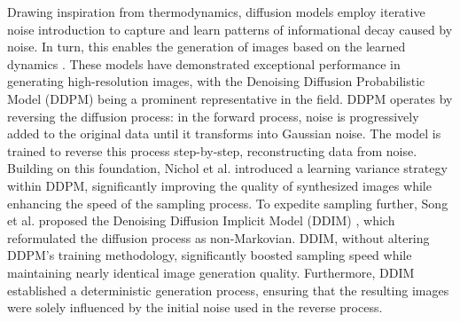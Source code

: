 Drawing inspiration from thermodynamics, diffusion models employ iterative noise introduction to capture and learn patterns of informational decay caused by noise. In turn, this enables the generation of images based on the learned dynamics \cite{Sohl-Dickstein2015DeepUnsupervisedLearning}. These models have demonstrated exceptional performance in generating high-resolution images, with the Denoising Diffusion Probabilistic Model (DDPM) \cite{Ho2020DenoisingDiffusionProbabilistic} being a prominent representative in the field. DDPM operates by reversing the diffusion process: in the forward process, noise is progressively added to the original data until it transforms into Gaussian noise. The model is trained to reverse this process step-by-step, reconstructing data from noise. Building on this foundation, Nichol et al. \cite{Nichol2021ImprovedDenoisingDiffusion} introduced a learning variance strategy within DDPM, significantly improving the quality of synthesized images while enhancing the speed of the sampling process. To expedite sampling further, Song et al. proposed the Denoising Diffusion Implicit Model (DDIM) \cite{Song2022DenoisingDiffusionImplicit}, which reformulated the diffusion process as non-Markovian. DDIM, without altering DDPM's training methodology, significantly boosted sampling speed while maintaining nearly identical image generation quality. Furthermore, DDIM established a deterministic generation process, ensuring that the resulting images were solely influenced by the initial noise used in the reverse process.

